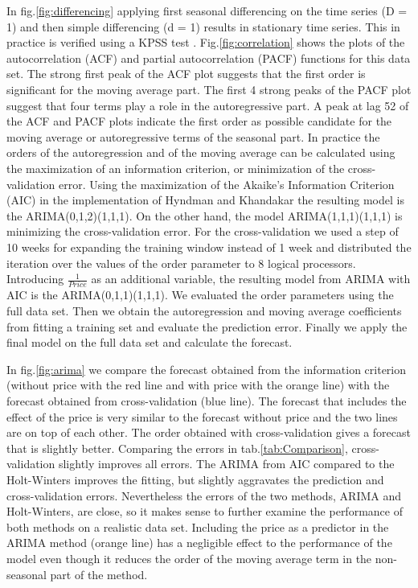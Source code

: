 \documentclass[12pt, letterpaper]{article}\usepackage[]{graphicx}\usepackage[]{color}
\begin{document}
In fig.\ref{fig:differencing} applying first seasonal differencing on the time series (D = 1) and then simple differencing (d = 1) results in stationary time series. This in practice is verified using a KPSS test \cite{KPSS}. Fig.\ref{fig:correlation} shows the plots of the autocorrelation (ACF) and partial autocorrelation (PACF) functions for this data set. The strong first peak of the ACF plot suggests that the first order is significant for the moving average part. The first 4 strong peaks of the PACF plot suggest that four terms play a role in the autoregressive part. A peak at lag 52 of the ACF and  PACF plots indicate the first order as possible candidate for the moving average or autoregressive terms of the seasonal part. In practice the orders of the autoregression and of the moving average can be calculated using the maximization of an information criterion, or minimization of the cross-validation error. Using the maximization of the Akaike's Information Criterion (AIC) in the implementation of Hyndman and Khandakar \cite{autoarima} the resulting model is the ARIMA(0,1,2)(1,1,1). On the other hand, the model ARIMA(1,1,1)(1,1,1) is minimizing the cross-validation error. For the cross-validation we used a step of 10 weeks for expanding the training window instead of 1 week and distributed the iteration over the values of the order parameter to 8 logical processors. Introducing $\frac{1}{Price}$ as an additional variable, the resulting model from ARIMA with AIC is the ARIMA(0,1,1)(1,1,1). We evaluated the order parameters using the full data set. Then we obtain the autoregression and moving average coefficients from fitting a training set and evaluate the prediction error. Finally we apply the final model on the full data set and calculate the forecast. 

In fig.\ref{fig:arima} we compare the forecast obtained from the information criterion (without price with the red line and with price with the orange line) with the forecast obtained from cross-validation (blue line). The forecast that includes the effect of the price is very similar to the forecast without price and the two lines are on top of each other. The order obtained with cross-validation gives a forecast that is slightly better. Comparing the errors in tab.\ref{tab:Comparison}, cross-validation slightly improves all errors. The ARIMA from AIC compared to the Holt-Winters improves the fitting, but slightly aggravates the prediction and cross-validation errors. Nevertheless the errors of the two methods, ARIMA and Holt-Winters, are close, so it makes sense to further examine the performance of both methods on a realistic data set. Including the price as a predictor in the ARIMA method (orange line) has a negligible effect to the performance of the model even though it reduces the order of the moving average term in the non-seasonal part of the method. 
\end{document}
